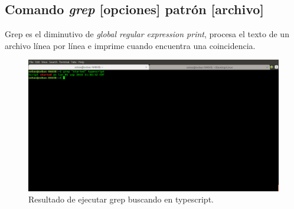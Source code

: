 \documentclass{article}
\begin{document}
\subsection{Comando \emph{grep} [opciones] patrón [archivo]}
Grep es el diminutivo de \emph{global regular expression print}, procesa el texto de un archivo línea por línea e imprime cuando encuentra una coincidencia. 
\begin{figure}[h]
    \centering
    \includegraphics[width=\textwidth]{grep.png}
    \caption{Resultado de ejecutar grep buscando  en typescript.}
\end{figure}
\end{document}
